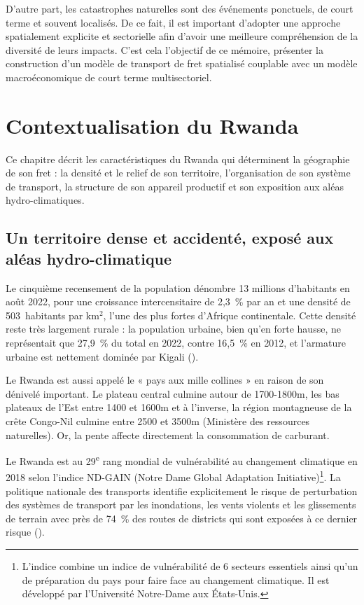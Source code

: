 \documentclass[12pt,a4paper,french]{report}
\begin{document}
	D'autre part, les catastrophes naturelles sont des événements ponctuels, de court terme et souvent localisés. De ce fait, il est important d'adopter une approche spatialement explicite et sectorielle afin d'avoir une meilleure compréhension de la diversité de leurs impacts. C'est cela l'objectif de ce mémoire, présenter la construction d'un modèle de transport de fret spatialisé couplable avec un modèle macroéconomique de court terme multisectoriel.
	

	\newpage
	
	\chapter{Contextualisation du Rwanda}
	\label{chap:contexte}

	Ce chapitre décrit les caractéristiques du Rwanda qui déterminent la géographie de son fret : la densité et le relief de son territoire, l'organisation de son système de transport, la structure de son appareil productif et son exposition aux aléas hydro-climatiques. 

	\section{Un territoire dense et accidenté, exposé aux aléas hydro-climatique}
	\label{sec:territoire}

	Le cinquième recensement de la population dénombre 13 millions d'habitants en août 2022, pour une croissance intercensitaire de 2,3~\% par an et une densité de 503~habitants par km$^2$, l'une des plus fortes d'Afrique continentale. Cette densité reste très largement rurale : la population urbaine, bien qu'en forte hausse, ne représentait que 27,9~\% du total en 2022, contre 16,5~\% en 2012, et l'armature urbaine est nettement dominée par Kigali (\cite{NISR2023}). 
	
	Le Rwanda est aussi appelé le « pays aux mille collines » en raison de son dénivelé important. Le plateau central culmine autour de 1700-1800m, les bas plateaux de l'Est entre 1400 et 1600m et à l'inverse, la région montagneuse de la crête Congo-Nil culmine entre 2500 et 3500m (Ministère des ressources naturelles). Or, la pente affecte directement la consommation de carburant.
	
	Le Rwanda est au 29\textsuperscript{e} rang mondial de vulnérabilité au changement climatique en 2018 selon l'indice ND-GAIN (Notre Dame Global Adaptation Initiative)\footnote{L'indice combine un indice de vulnérabilité de 6 secteurs essentiels ainsi qu'un de préparation du pays pour faire face au changement climatique. Il est développé par l'Université Notre-Dame aux États-Unis.}. La politique nationale des transports identifie explicitement le risque de perturbation des systèmes de transport par les inondations, les vents violents et les glissements de terrain avec près de 74~\% des routes de districts qui sont exposées à ce dernier risque (\cite{MININFRA2021}).
	
\end{document}
